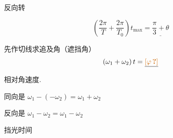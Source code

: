 
反向转

\[ \left(\frac{2\pi}{T}+\frac{2\pi}{T_0}\right)t_{\max}=\underline{\frac{\pi}{3}+\theta} \]

先作切线\quad 求追及角（遮挡角）
\[ (\omega_1+\omega_2)\,t=\underline{\unclear{\varphi}} \]%

相对角速度.

同向是 $\omega_1-(-\omega_2)=\omega_1+\omega_2$%

反向是 $\omega_1-\omega_2=\omega_1-\omega_2$

\quad \red{$2\varphi=2\alpha+2\beta$}

挡光时间 

